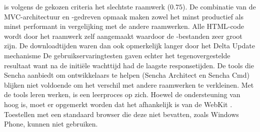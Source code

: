 
\st{} is volgens de gekozen criteria het slechtste raamwerk ($0.75$).
De combinatie van de MVC-architectuur en \js-gedreven opmaak maken \st{} zowel het minst productief als minst performant in vergelijking met de andere raamwerken.
Alle HTML-code wordt door het raamwerk zelf aangemaakt waardoor de \js-bestanden zeer groot zijn.
De downloadtijden waren dan ook opmerkelijk langer door het Delta Update mechanisme
De gebruikservaringtesten gaven echter het tegenovergestelde resultaat want na de initiële wachttijd had \st{} de laagste responsetijden.
De tools die Sencha aanbiedt om ontwikkelaars te helpen (Sencha Architect en Sencha Cmd) blijken niet voldoende om het verschil met andere raamwerken te verkleinen.
Met de tools leren werken, is een leerproces op zich.
Hoewel de ondersteuning van \st{} hoog is, moet er opgemerkt worden dat het afhankelijk is van de WebKit .
Toestellen met een standaard browser die deze  niet bevatten, zoals Windows Phone,  kunnen \st{} niet gebruiken.














